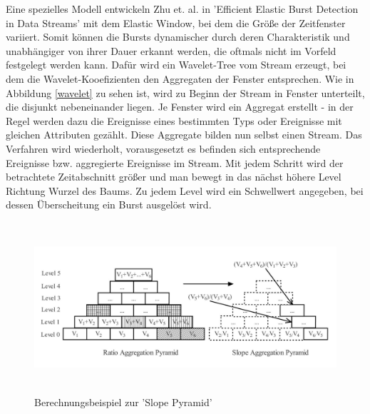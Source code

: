 Eine spezielles Modell entwickeln Zhu et. al. in 'Efficient Elastic Burst Detection in Data Streams' \cite{Zhu:2003:EEB:956750.956789} mit dem Elastic Window, bei dem   die Größe der Zeitfenster variiert. Somit können die Bursts dynamischer durch deren Charakteristik und unabhängiger von ihrer Dauer erkannt werden, die oftmals nicht im Vorfeld festgelegt werden kann. Dafür wird ein Wavelet-Tree vom Stream erzeugt, bei dem die Wavelet-Kooefizienten den Aggregaten der Fenster entsprechen. Wie in Abbildung \ref{wavelet} zu sehen ist, wird zu Beginn der Stream in Fenster unterteilt, die disjunkt nebeneinander liegen. Je Fenster wird ein Aggregat erstellt - in der Regel werden dazu die Ereignisse eines bestimmten Typs oder Ereignisse mit gleichen Attributen gezählt. Diese Aggregate bilden nun selbst einen Stream. Das Verfahren wird wiederholt, vorausgesetzt es befinden sich entsprechende Ereignisse bzw. aggregierte Ereignisse im Stream. Mit jedem Schritt wird der betrachtete Zeitabschnitt größer und man bewegt in das nächst höhere Level Richtung Wurzel des Baums. Zu jedem Level wird ein Schwellwert angegeben, bei dessen Überscheitung ein Burst ausgelöst wird.

\begin{figure}[htbp]
\centerline{\includegraphics[height=6.3cm]{images/slopepyramid.jpg}}
\caption{Berechnungsbeispiel zur 'Slope Pyramid' \cite{yuan2007online}}
\label{fig:slopepyramid}
\end{figure}




